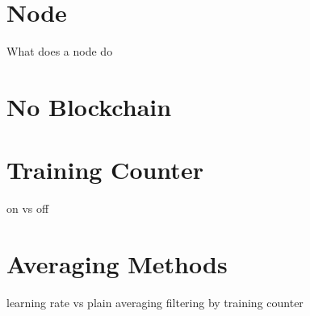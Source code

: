\section{Node}
What does a node do
\section{No Blockchain}
\section{Training Counter}
on vs off
\section{Averaging Methods}
learning rate vs plain averaging
filtering by training counter